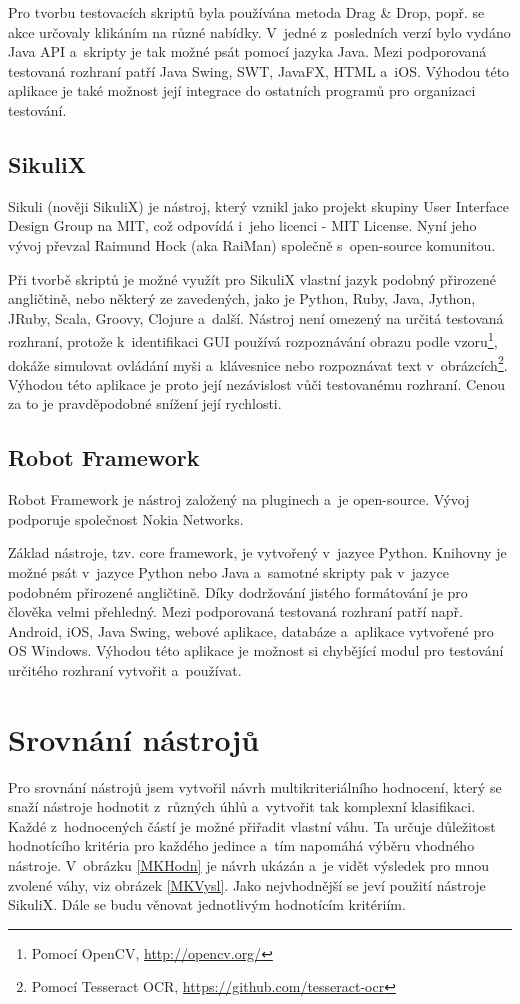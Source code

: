 \documentclass{bakalarka}
\begin{document}
	Pro tvorbu testovacích skriptů byla používána metoda Drag \& Drop, popř. se akce určovaly klikáním na různé nabídky. V~jedné z~posledních verzí bylo vydáno Java API a~skripty je tak možné psát pomocí jazyka Java. Mezi podporovaná testovaná rozhraní patří Java Swing, SWT, JavaFX, HTML a~iOS. Výhodou této aplikace je také možnost její integrace do ostatních programů pro organizaci testování.
	
	\section{SikuliX}
	Sikuli (nověji SikuliX) je nástroj, který vznikl jako projekt skupiny User Interface Design Group na MIT, což odpovídá i~jeho licenci - MIT License. Nyní jeho vývoj převzal Raimund Hock (aka RaiMan) společně s~open-source komunitou.
	
	Při tvorbě skriptů je možné využít pro SikuliX vlastní jazyk podobný přirozené angličtině, nebo některý ze zavedených, jako je Python, Ruby, Java, Jython, JRuby, Scala, Groovy, Clojure a~další. Nástroj není omezený na určitá testovaná rozhraní, protože k~identifikaci GUI používá rozpoznávání obrazu podle vzoru\footnote{Pomocí OpenCV, \url{http://opencv.org/}}, dokáže simulovat ovládání myši a~klávesnice nebo rozpoznávat text v~obrázcích\footnote{Pomocí Tesseract OCR, \url{https://github.com/tesseract-ocr}}. Výhodou této aplikace je proto její nezávislost vůči testovanému rozhraní. Cenou za to je pravděpodobné snížení její rychlosti.
	
	\section{Robot Framework}
	Robot Framework je nástroj založený na pluginech a~je open-source. Vývoj podporuje společnost Nokia Networks.
	
	Základ nástroje, tzv. core framework, je vytvořený v~jazyce Python. Knihovny je možné psát v~jazyce Python nebo Java a~samotné skripty pak v~jazyce podobném přirozené angličtině. Díky dodržování jistého formátování je pro člověka velmi přehledný. Mezi podporovaná testovaná rozhraní patří např. Android, iOS, Java Swing, webové aplikace, databáze a~aplikace vytvořené pro OS Windows. Výhodou této aplikace je možnost si chybějící modul pro testování určitého rozhraní vytvořit a~používat.
	
\chapter{Srovnání nástrojů}
Pro srovnání nástrojů jsem vytvořil návrh multikriteriálního hodnocení, který se snaží nástroje hodnotit z~různých úhlů a~vytvořit tak komplexní klasifikaci. Každé z~hodnocených částí je možné přiřadit vlastní váhu. Ta určuje důležitost hodnotícího kritéria pro každého jedince a~tím napomáhá výběru vhodného nástroje. V~obrázku \ref{MKHodn} je návrh ukázán a~je vidět výsledek pro mnou zvolené váhy, viz obrázek \ref{MKVysl}. Jako nejvhodnější se jeví použití nástroje SikuliX. Dále se budu věnovat jednotlivým hodnotícím kritériím.
\end{document}
